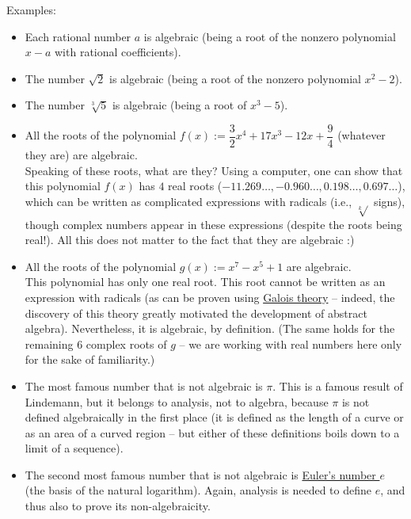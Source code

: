 \documentclass[numbers=enddot,12pt,final,onecolumn,notitlepage]{scrartcl}%
\numberwithin{exer}{section}
\theoremstyle{definition}
\newcommand{\tup}[1]{\left( #1 \right)}
\begin{document}
Examples:

\begin{itemize}

 \item Each rational number $a$ is algebraic (being a root of the
       nonzero polynomial $x-a$ with rational coefficients).

 \item The number $\sqrt{2}$ is algebraic (being a root of the
       nonzero polynomial $x^{2}-2$).

 \item The number $\sqrt[3]{5}$ is algebraic (being a root of $x^{3}-5$).
 
 \item All the roots of the polynomial
       $f\tup{x} := \dfrac{3}{2}x^{4}+17x^{3}-12x+\dfrac{9}{4}$ (whatever
       they are) are algebraic. \\
       Speaking of these roots, what are they?
       Using a computer, one can show that this polynomial $f\tup{x}$ has
       $4$ real roots ($-11.269\ldots, -0.960\ldots, 0.198\ldots, 0.697\ldots$),
       which can be written as complicated expressions with radicals
       (i.e., $\sqrt[k]{}$ signs), though complex numbers appear in these
       expressions (despite the roots being real!).
       All this does not matter to the fact that they are algebraic :)

 \item All the roots of the polynomial
       $g\tup{x} := x^7 - x^5 + 1$ are algebraic. \\
       This polynomial has only one real root.
       This root cannot be written as an expression with radicals
       (as can be proven using
       \href{https://en.wikipedia.org/wiki/Galois_theory}{Galois theory}
       -- indeed, the discovery of
       this theory greatly motivated the development of abstract algebra).
       Nevertheless, it is algebraic, by definition.
       (The same holds for the remaining $6$ complex roots of $g$ --
       we are working with real numbers here only for the sake of
       familiarity.)

 \item The most famous number that is not algebraic is $\pi$.
       This is a famous result of Lindemann, but it belongs to analysis,
       not to algebra, because $\pi$ is not defined algebraically in
       the first place (it is defined as the length of a curve or as
       an area of a curved region -- but either of these definitions
       boils down to a limit of a sequence).

 \item The second most famous number that is not algebraic is
       \href{https://en.wikipedia.org/wiki/E_(mathematical_constant)}{Euler's number $e$}
       (the basis of the natural logarithm).
       Again, analysis is needed to define $e$, and thus also to prove
       its non-algebraicity.

\end{itemize}
\end{document}
